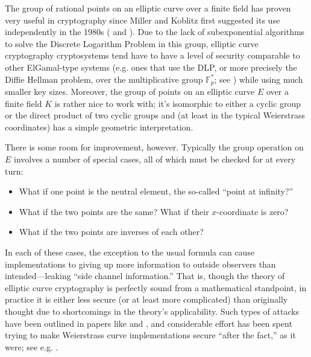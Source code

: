 \label{chp:intro}

The group of rational points on an elliptic curve over a finite field has
    proven very useful in cryptography since Miller and Koblitz first suggested
    its use independently in the 1980s (\cite{miller1986use} and
    \cite{koblitz1987elliptic}).
Due to the lack of subexponential algorithms to solve the Discrete Logarithm
    Problem in this group, elliptic curve cryptography cryptosystems tend have
    to have a level of security comparable to other ElGamal-type systems (e.g.
    ones that use the DLP, or more precisely the Diffie Hellman problem, over
    the multiplicative group $\mathbb{F}_{p}^\ast$; see
    \cite{stinson2005cryptography}) while using much smaller key sizes.
Moreover, the group of points on an elliptic curve $E$ over a finite field $K$
    is rather nice to work with; it's isomorphic to either a cyclic group or
    the direct product of two cyclic groups and (at least in the typical
    Weierstrass coordinates) has a simple geometric interpretation.

There is some room for improvement, however.
Typically the group operation on $E$ involves a number of special cases, all of
    which must be checked for at every turn:
\begin{itemize}
\item   What if one point is the neutral element, the so-called ``point at
    infinity?''
\item   What if the two points are the same?
    What if their $x$-coordinate is zero?
\item   What if the two points are inverses of each other?
\end{itemize}
In each of these cases, the exception to the usual formula can cause
    implementations to giving up more information to outside observers than
    intended---leaking ``side channel information.''
That is, though the theory of elliptic curve cryptography is perfectly sound
    from a mathematical standpoint, in practice it is either less secure (or at
    least more complicated) than originally thought due to shortcomings in the
    theory's applicability.
Such types of attacks have been outlined in papers like
    \cite{brier2002weierstrass} and \cite{izu2002exceptional}, and considerable
    effort has been spent trying to make Weierstrass curve implementations
    secure ``after the fact,'' as it were; see e.g. \cite{moller2001securing}.

